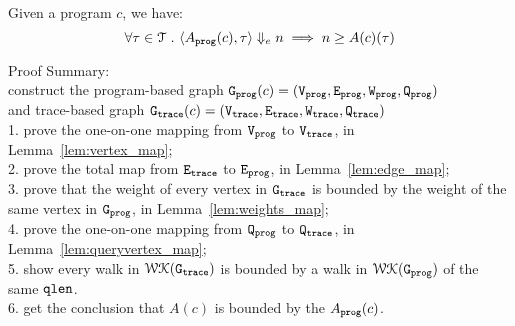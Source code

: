   \begin{thm}
    \label{thm:adaptfun_soundness}
  Given a program ${c}$, we have:
  \[
    \forall \mathtt{\tau} \in \mathcal{T} ~.~ 
    \langle A_{\mathtt{prog}}(c), \mathtt{\tau} \rangle \Downarrow_e n \implies n \geq A(c)(\mathtt{\tau})
  \]
  \end{thm}
Proof Summary:
\\
construct the
program-based graph $\mathtt{{G_{prog}}}({c}) = (\mathtt{{V_{prog}}}, \mathtt{{E_{prog}}}, \mathtt{{W_{prog}}}, \mathtt{{Q_{prog}}})$
\\
and trace-based graph $\mathtt{{G_{trace}}}({c}) = (\mathtt{{V_{trace}}}, \mathtt{{E_{trace}}}, \mathtt{{W_{trace}}}, \mathtt{{Q_{trace}}})$ 
\\
1. prove the one-on-one mapping from $\mathtt{{V_{prog}}}$ to $\mathtt{{V_{trace}}}$, in Lemma~\ref{lem:vertex_map};
\\
2. prove the total map from $\mathtt{{E_{trace}}}$ to $\mathtt{{E_{prog}}}$, in Lemma~\ref{lem:edge_map};
\\
3. prove that the weight of every vertex in $\mathtt{{G_{trace}}}$ is bounded by the weight of the same vertex in $\mathtt{{G_{prog}}}$, in 
Lemma~\ref{lem:weights_map};
\\
4. prove the one-on-one mapping from $\mathtt{{Q_{prog}}}$ to $\mathtt{{Q_{trace}}}$, in Lemma~\ref{lem:queryvertex_map};
\\
5. show every walk in $\mathcal{WK}(\mathtt{{G_{trace}}})$ is bounded by a walk in $\mathcal{WK}(\mathtt{{G_{prog}}})$ of the same $\mathtt{qlen}$.
\\
6. get the conclusion that $A(c)$ is bounded by 
the $A_{\mathtt{prog}}(c)$.
%
